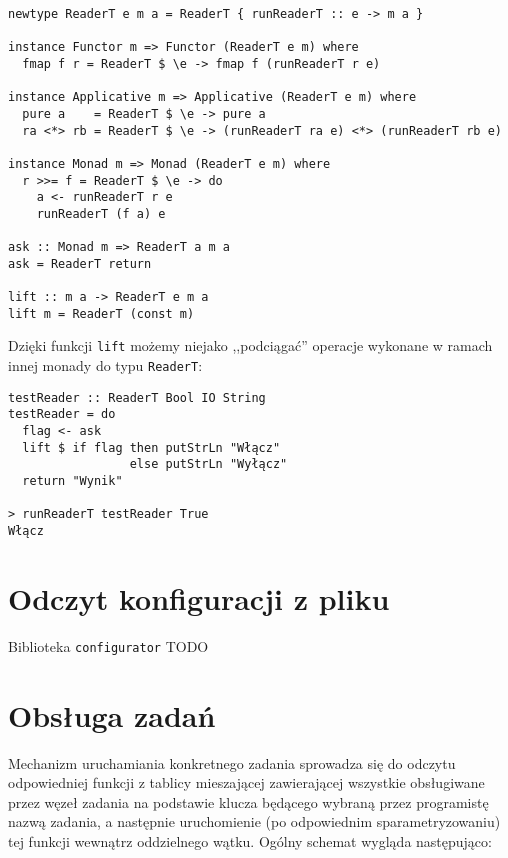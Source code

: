 \begin{lstlisting}[caption=Transformator typu Reader]
newtype ReaderT e m a = ReaderT { runReaderT :: e -> m a }

instance Functor m => Functor (ReaderT e m) where
  fmap f r = ReaderT $ \e -> fmap f (runReaderT r e)

instance Applicative m => Applicative (ReaderT e m) where
  pure a    = ReaderT $ \e -> pure a
  ra <*> rb = ReaderT $ \e -> (runReaderT ra e) <*> (runReaderT rb e)

instance Monad m => Monad (ReaderT e m) where 
  r >>= f = ReaderT $ \e -> do
    a <- runReaderT r e
    runReaderT (f a) e

ask :: Monad m => ReaderT a m a
ask = ReaderT return

lift :: m a -> ReaderT e m a
lift m = ReaderT (const m)
\end{lstlisting}
Dzięki funkcji \lstinline{lift} możemy niejako ,,podciągać'' operacje wykonane w ramach innej monady do typu \lstinline{ReaderT}:

\begin{lstlisting}
testReader :: ReaderT Bool IO String
testReader = do
  flag <- ask 
  lift $ if flag then putStrLn "Włącz"
                 else putStrLn "Wyłącz"
  return "Wynik"

> runReaderT testReader True
Włącz
\end{lstlisting}

\newpage
\section{Odczyt konfiguracji z pliku}
Biblioteka \texttt{configurator}\cite{Config} TODO

\section{Obsługa zadań}
Mechanizm uruchamiania konkretnego zadania sprowadza się do odczytu odpowiedniej funkcji z tablicy mieszającej zawierającej wszystkie obsługiwane przez węzeł zadania na podstawie klucza będącego wybraną przez programistę nazwą zadania, a następnie uruchomienie (po odpowiednim sparametryzowaniu) tej funkcji wewnątrz oddzielnego wątku. Ogólny schemat wygląda następująco:

